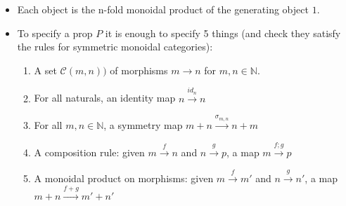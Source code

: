 \begin{itemize}
    \item Each object is the n-fold monoidal product of the generating object $1$.
    \item To specify a prop $P$ it is enough to specify 5 things (and check they satisfy the rules for symmetric monoidal categories):
          \begin{enumerate}
            \item A set $\mathcal{C}(m,n))$ of morphisms $m \rightarrow n$ for $m,n \in \mathbb{N}$.
            \item For all naturals, an identity map $n \xrightarrow{id_n} n$
            \item For all $m,n \in \mathbb{N}$, a symmetry map $m+n \xrightarrow{\sigma_{m,n}} n+m$
            \item A composition rule: given $m \xrightarrow f n$ and $n \xrightarrow g p$, a map $m \xrightarrow{f;g} p$
            \item A monoidal product on morphisms: given $m \xrightarrow f m'$ and $n \xrightarrow g n'$, a map $m+n \xrightarrow{f+g} m' +n'$
          \end{enumerate}
  \end{itemize}
